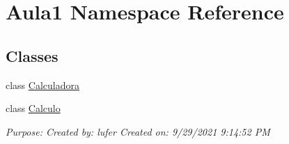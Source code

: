 \hypertarget{namespaceAula1}{}\section{Aula1 Namespace Reference}
\label{namespaceAula1}
\subsection*{Classes}
\begin{DoxyCompactItemize}
\item 
class \mbox{\hyperlink{classAula1_1_1Calculadora}{Calculadora}}
\item 
class \mbox{\hyperlink{classAula1_1_1Calculo}{Calculo}}
\begin{DoxyCompactList}\small\item\em Purpose\+: Created by\+: lufer Created on\+: 9/29/2021 9\+:14\+:52 PM \end{DoxyCompactList}\end{DoxyCompactItemize}
